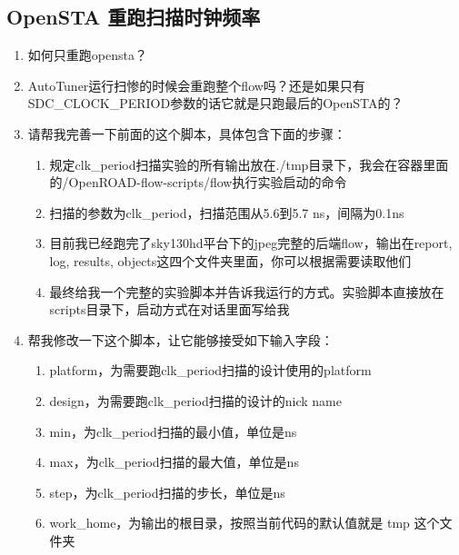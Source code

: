 \documentclass[UTF8,a4paper,11pt,fontset=fandol]{ctexart}
\begin{document}
\subsection{OpenSTA 重跑扫描时钟频率}
\begin{enumerate}
    \item 如何只重跑opensta？
    \item AutoTuner运行扫惨的时候会重跑整个flow吗？还是如果只有SDC\_CLOCK\_PERIOD参数的话它就是只跑最后的OpenSTA的？
    \item 请帮我完善一下前面的这个脚本，具体包含下面的步骤：

    \begin{enumerate}
        \item 规定clk\_period扫描实验的所有输出放在./tmp目录下，我会在容器里面的/OpenROAD-flow-scripts/flow执行实验启动的命令
        \item 扫描的参数为clk\_period，扫描范围从5.6到5.7 ns，间隔为0.1ns
        \item 目前我已经跑完了sky130hd平台下的jpeg完整的后端flow，输出在report, log, results, objects这四个文件夹里面，你可以根据需要读取他们
        \item 最终给我一个完整的实验脚本并告诉我运行的方式。实验脚本直接放在scripts目录下，启动方式在对话里面写给我
    \end{enumerate}
    \item 帮我修改一下这个脚本，让它能够接受如下输入字段：

    \begin{enumerate}
        \item platform，为需要跑clk\_period扫描的设计使用的platform
        \item design，为需要跑clk\_period扫描的设计的nick name
        \item min，为clk\_period扫描的最小值，单位是ns
        \item max，为clk\_period扫描的最大值，单位是ns
        \item step，为clk\_period扫描的步长，单位是ns
        \item work\_home，为输出的根目录，按照当前代码的默认值就是 tmp 这个文件夹
    \end{enumerate}
\end{enumerate}
\end{document}
